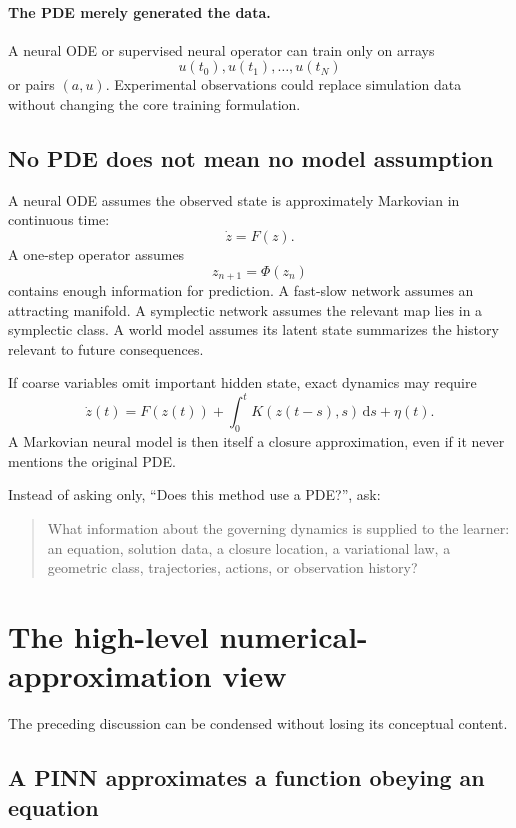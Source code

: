 \documentclass[11pt]{article}
\newcommand{\dd}{\,\mathrm{d}}
\begin{document}
\paragraph{The PDE merely generated the data.}
A neural ODE or supervised neural operator can train only on arrays
\[
 u(t_0),u(t_1),\ldots,u(t_N)
\]
or pairs \((a,u)\). Experimental observations could replace simulation data without changing the core training formulation.

\subsection{No PDE does not mean no model assumption}

A neural ODE assumes the observed state is approximately Markovian in continuous time:
\[
 \dot z=F(z).
\]
A one-step operator assumes
\[
 z_{n+1}=\Phi(z_n)
\]
contains enough information for prediction. A fast-slow network assumes an attracting manifold. A symplectic network assumes the relevant map lies in a symplectic class. A world model assumes its latent state summarizes the history relevant to future consequences.

If coarse variables omit important hidden state, exact dynamics may require
\begin{equation}
 \dot z(t)
 =F(z(t))
 +\int_0^tK(z(t-s),s)\dd s
 +\eta(t).
\end{equation}
A Markovian neural model is then itself a closure approximation, even if it never mentions the original PDE.

\begin{takeaway}
Instead of asking only, ``Does this method use a PDE?'', ask:
\begin{quote}
What information about the governing dynamics is supplied to the learner: an equation, solution data, a closure location, a variational law, a geometric class, trajectories, actions, or observation history?
\end{quote}
\end{takeaway}

\section{The high-level numerical-approximation view}

The preceding discussion can be condensed without losing its conceptual content.

\subsection{A PINN approximates a function obeying an equation}
\end{document}
